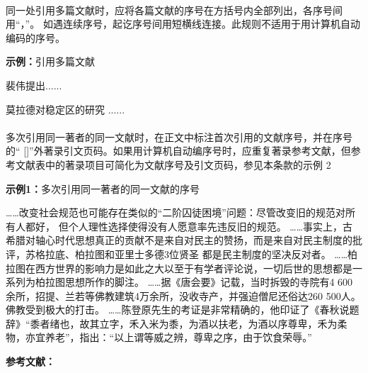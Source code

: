 \documentclass[twoside]{article}%
\begin{document}
\paragraph{} 同一处引用多篇文献时，应将各篇文献的序号在方括号内全部列出，各序号间用“，”。
如遇连续序号，起讫序号间用短横线连接。此规则不适用于用计算机自动编码的序号。

\begin{refsection}
\textbf{示例：}引用多篇文献

裴伟提出\cite{Humphrey1971--,KENNEDY1975-311-386}......

莫拉德对稳定区的研究
\cite{CRANE1972--,Weinstein1974-745-772,KENNEDY1975-311-386}......


\end{refsection}


\paragraph{}\label{sec:numeric:multic} 多次引用同一著者的同一文献时，在正文中标注首次引用的文献序号，并在序号的“ []”外著录引文页码。如果用计算机自动编序号时，应重复著录参考文献，但参考文献表中的著录项目可简化为文献序号及引文页码，参见本条款的示例 2

\begin{refsection}
\textbf{示例1：}多次引用同一著者的同一文献的序号

……改变社会规范也可能存在类似的“二阶囚徒困境”问题：尽管改变旧的规范对所有人都好，
但个人理性选择使得没有人愿意率先违反旧的规范\cite{Sunstein1996-903-903}。
……事实上，古希腊对轴心时代思想真正的贡献不是来自对民主的赞扬，而是来自对民主制度的批评，苏格拉底、柏拉图和亚里士多德3位贤圣
都是民主制度的坚决反对者。
……柏拉图在西方世界的影响力是如此之大以至于有学者评论说，一切后世的思想都是一系列为柏拉图思想所作的脚注\cite{罗杰斯2011-15-16}。
……据《唐会要》记载，当时拆毁的寺院有4 600余所，招提、兰若等佛教建筑4万余所，没收寺产，并强迫僧尼还俗达260 500人。
佛教受到极大的打击。
……陈登原先生的考证是非常精确的，他印证了《春秋说题辞》“黍者绪也，故其立字，禾入米为黍，为酒以扶老，为酒以序尊卑，禾为柔物，亦宜养老”，指出：“以上谓等威之辨，尊卑之序，由于饮食荣辱。”\cite{陈登原2000-29-29}

\textbf{参考文献：}

\printbibliography[heading=none,env=indentegenv]
\end{refsection}
\end{document}
